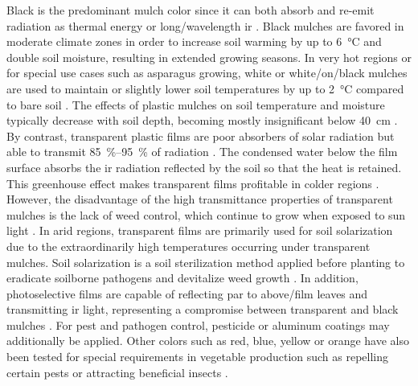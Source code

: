 Black is the predominant mulch color since it can both absorb and re-emit radiation as thermal energy or long\-/wavelength \ac{ir} \citep{LamontPlastic1993,LamontPlastics2005}. Black mulch\-es are favored in moderate climate zones in order to increase soil warming by up to \SI{6}{\degreeCelsius} and double soil moisture, resulting in extended growing seasons. In very hot regions or for special use cases such as asparagus growing, white or white\-/on\-/black mulches are used to maintain or slightly lower soil temperatures by up to \SI{2}{\degreeCelsius} compared to bare soil \citep{HamOptical1993,HeissnerComparison2005}. The effects of plastic mulches on soil temperature and moisture typically decrease with soil depth, becoming mostly insignificant below \SI{40}{\centi\meter} \citep{Diaz-HernandezEffects2012,HeissnerComparison2005}. By contrast, transparent plastic films are poor absorbers of solar radiation but able to transmit \SIrange{85}{95}{\percent} of radiation \citep{HamOptical1993}. The condensed water below the film surface absorbs the \ac{ir} radiation reflected by the soil so that the heat is retained. This greenhouse effect makes transparent films profitable in colder regions \citep[for instance][]{HaynesUse1987,StreckEffect1995}. However, the disadvantage of the high transmittance properties of transparent mulches is the lack of weed control, which continue to grow when exposed to sun light \citep{LamontPlastic1993}. In arid regions, transparent films are primarily used for soil solarization due to the extraordinarily high temperatures occurring under transparent mulches. Soil solarization is a soil sterilization method applied before planting to eradicate soilborne pathogens and devitalize weed growth \citep{HorowitzSolarization1983,TamiettiSoil2006}. In addition, photoselective films are capable of reflecting \ac{par} to above\-/film leaves and transmitting \ac{ir} light, representing a compromise between transparent and black mulches \citep{PaulUse2005}. For pest and pathogen control, pesticide \citep{SubrahmaniyanWeed2011} or aluminum \citep{CsizinszkyColor1995} coatings may additionally be applied. Other colors such as red, blue, yellow or orange have also been tested for special requirements in vegetable production such as repelling certain pests or attracting beneficial insects \citep{CsizinszkyColor1995,LamontPainting1990, OrzolekUse1993}.

